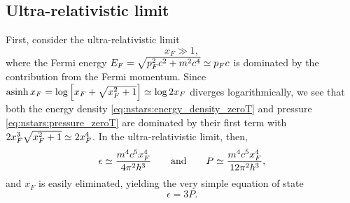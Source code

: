 
\subsection{Ultra-relativistic limit}
\label{sec:nstars:ur_limit}

First, consider the ultra-relativistic limit
\begin{equation}
	x_F \gg 1 , 
\label{eq:nstars:ur_limit}
\end{equation}
where the Fermi energy $E_F = \sqrt{p_F^2 c^2 + m^2 c^4} \simeq p_F c$ is dominated by the contribution from the Fermi momentum.
Since $\operatorname{asinh} x_F = \log \left[ x_F + \sqrt{x_F^2 + 1} \right] \simeq \log 2 x_F$ diverges logarithmically, we see that both the energy density \eqref{eq:nstars:energy_density_zeroT} and pressure \eqref{eq:nstars:pressure_zeroT} are dominated by their first term with $2 x_F^3 \sqrt{x_F^2 + 1} \simeq 2 x_F^4$.
In the ultra-relativistic limit, then,
\begin{equation}
	\epsilon \simeq \frac{m^4 c^5 x_F^4}{4 \pi^2 \hbar^3}
	\qquad \text{and} \qquad
	P        \simeq \frac{m^4 c^5 x_F^4}{12 \pi^2 \hbar^3},
\end{equation}
and $x_F$ is easily eliminated, yielding the very simple equation of state
\begin{equation}
	\epsilon = 3 P .
\label{eq:nstars:ur_eos}
\end{equation}

